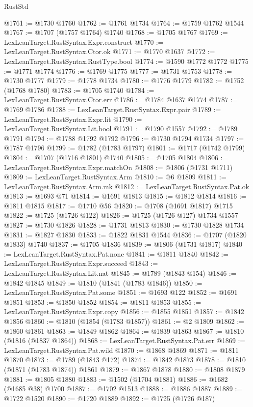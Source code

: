 \begin{lexlean}{RustStd}
\begin{coremodule}
@1761 := @1730 @1760
@1762 := @1761 @1734
@1764 := @1759 @1762 @1544
@1767 := @1707 (@1757 @1764) @1740
@1768 := @1705 @1767
@1769 := LexLeanTarget.RustSyntax.Expr.construct
@1770 := LexLeanTarget.RustSyntax.Ctor.ok
@1771 := @1770 @1637
@1772 := LexLeanTarget.RustSyntax.RustType.bool
@1774 := @1590 @1772 @1772
@1775 := @1771 @1774
@1776 := @1769 @1775
@1777 := @1731 @1753
@1778 := @1730 @1777
@1779 := @1778 @1734
@1780 := @1776 @1779
@1782 := @1752 (@1768 @1780)
@1783 := @1705 @1740
@1784 := LexLeanTarget.RustSyntax.Ctor.err
@1786 := @1784 @1637 @1774
@1787 := @1769 @1786
@1788 := LexLeanTarget.RustSyntax.Expr.pair
@1789 := LexLeanTarget.RustSyntax.Expr.lit
@1790 := LexLeanTarget.RustSyntax.Lit.bool
@1791 := @1790 @1557
@1792 := @1789 @1791
@1794 := @1788 @1792 @1792
@1796 := @1730 @1794 @1734
@1797 := @1787 @1796
@1799 := @1782 (@1783 @1797)
@1801 := @1717 (@1742 @1799)
@1804 := @1707 (@1716 @1801) @1740
@1805 := @1705 @1804
@1806 := LexLeanTarget.RustSyntax.Expr.matchOn
@1808 := @1806 (@1731 @1711)
@1809 := LexLeanTarget.RustSyntax.Arm
@1810 := @6 @1809
@1811 := LexLeanTarget.RustSyntax.Arm.mk
@1812 := LexLeanTarget.RustSyntax.Pat.ok
@1813 := @1693 @71
@1814 := @1691 @1813
@1815 := @1812 @1814
@1816 := @1811 @1815
@1817 := @1710 @56
@1820 := @1708 (@1691 @1817) @1715
@1822 := @1725 (@1726 @122)
@1826 := @1725 (@1726 @127) @1734 @1557
@1827 := @1730 @1826
@1828 := @1731 @1813
@1830 := @1730 @1828 @1734
@1831 := @1827 @1830
@1833 := @1822 @1831 @1544
@1836 := @1707 (@1820 @1833) @1740
@1837 := @1705 @1836
@1839 := @1806 (@1731 @1817)
@1840 := LexLeanTarget.RustSyntax.Pat.none
@1841 := @1811 @1840
@1842 := LexLeanTarget.RustSyntax.Expr.succeed
@1843 := LexLeanTarget.RustSyntax.Lit.nat
@1845 := @1789 (@1843 @154)
@1846 := @1842 @1845
@1849 := @1810 (@1841 (@1783 @1846))
@1850 := LexLeanTarget.RustSyntax.Pat.some
@1851 := @1693 @122
@1852 := @1691 @1851
@1853 := @1850 @1852
@1854 := @1811 @1853
@1855 := LexLeanTarget.RustSyntax.Expr.copy
@1856 := @1855 @1851
@1857 := @1842 @1856
@1860 := @1810 (@1854 (@1783 @1857))
@1861 := @2 @1809
@1862 := @1860 @1861
@1863 := @1849 @1862
@1864 := @1839 @1863
@1867 := @1810 (@1816 (@1837 @1864))
@1868 := LexLeanTarget.RustSyntax.Pat.err
@1869 := LexLeanTarget.RustSyntax.Pat.wild
@1870 := @1868 @1869
@1871 := @1811 @1870
@1873 := @1789 (@1843 @172)
@1874 := @1842 @1873
@1878 := @1810 (@1871 (@1783 @1874)) @1861
@1879 := @1867 @1878
@1880 := @1808 @1879
@1881 := @1805 @1880
@1883 := @1502 (@1704 @1881)
@1886 := @1682 (@1685 @38) @1700
@1887 := @1702 @1513
@1888 := @1886 @1887
@1889 := @1722 @1520
@1890 := @1720 @1889
@1892 := @1725 (@1726 @187)

\end{coremodule}
\end{lexlean}
